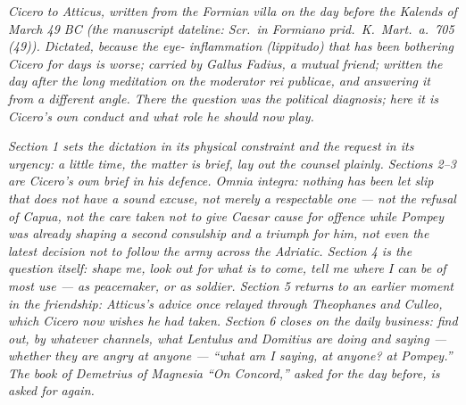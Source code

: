 
\textit{Cicero to Atticus, written from the Formian
villa on the day before the Kalends of March 49 BC (the
manuscript dateline: \textit{Scr.\ in Formiano prid.\ K.\
Mart.\ a.\ 705 (49)}). Dictated, because the eye-
inflammation (\textit{lippitudo}) that has been bothering
Cicero for days is worse; carried by Gallus Fadius, a
mutual friend; written the day after the long meditation
on the \textit{moderator rei publicae}, and answering it
from a different angle. There the question was the
political diagnosis; here it is Cicero's own conduct
and what role he should now play.}

\textit{Section 1 sets the dictation in its physical
constraint and the request in its urgency: a little
time, the matter is brief, lay out the counsel plainly.
Sections 2--3 are Cicero's own brief in his defence.
\textit{Omnia integra}: nothing has been let slip that
does not have a sound excuse, not merely a respectable
one --- not the refusal of Capua, not the care taken
not to give Caesar cause for offence while Pompey was
already shaping a second consulship and a triumph for
him, not even the latest decision not to follow the
army across the Adriatic. Section 4 is the question
itself: shape me, look out for what is to come, tell me
where I can be of most use --- as peacemaker, or as
soldier. Section 5 returns to an earlier moment in the
friendship: Atticus's advice once relayed through
Theophanes and Culleo, which Cicero now wishes he had
taken. Section 6 closes on the daily business: find
out, by whatever channels, what Lentulus and Domitius
are doing and saying --- whether they are angry at
anyone --- ``what am I saying, at anyone? at Pompey.''
The book of Demetrius of Magnesia ``On Concord,'' asked
for the day before, is asked for again.}
